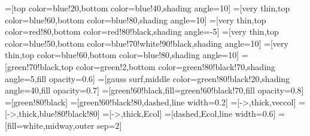 \tikzset{>=latex} %
\contourlength{1.4pt}

=[top color=blue!20,bottom color=blue!40,shading angle=10]
=[very thin,top color=blue!60,bottom color=blue!80,shading angle=10]
=[very thin,top color=red!80,bottom color=red!80!black,shading angle=-5]
=[very thin,top color=blue!50,bottom color=blue!70!white!90!black,shading angle=10]
=[very thin,top color=blue!60,bottom color=blue!80,shading angle=10]
=[green!70!black,top color=green!2,bottom color=green!80!black!70,shading angle=5,fill opacity=0.6]
=[gauss surf,middle color=green!80!black!20,shading angle=40,fill opacity=0.7]
=[green!60!black,fill=green!60!black!70,fill opacity=0.8]
=[green!80!black]
=[green!60!black!80,dashed,line width=0.2]
=[->,thick,veccol]
=[->,thick,blue!80!black!80]
=[->,thick,Ecol]
=[dashed,Ecol,line width=0.6]
=[fill=white,midway,outer sep=2]
\def\L{2.2}
\def\H{2.2}
\def\offset{2.0}
\def\W{0.30}
\def\Nx{5}
\def\Ny{5}







